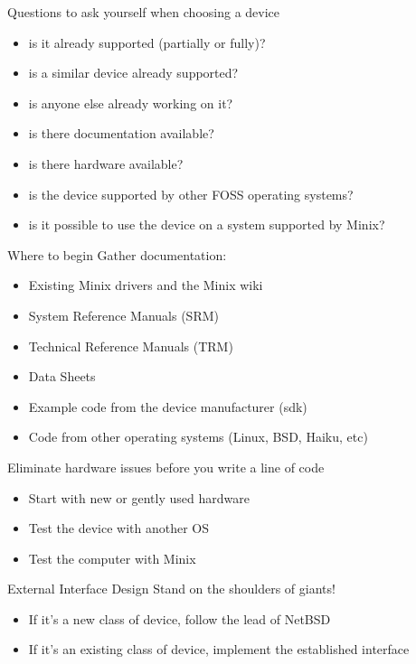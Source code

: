 \documentclass{beamer}
\begin{document}
\begin{frame}{Questions to ask yourself when choosing a device}
  \begin{itemize}
  \item is it already supported (partially or fully)?
  \item is a similar device already supported?
  \item is anyone else already working on it?
  \item is there documentation available?
  \item is there hardware available?
  \item is the device supported by other FOSS operating systems?
  \item is it possible to use the device on a system supported by Minix?
  \end{itemize}
\end{frame}

\begin{frame}{Where to begin}
  Gather documentation:
  \begin{itemize}
  \item Existing Minix drivers and the Minix wiki
  \item System Reference Manuals (SRM)
  \item Technical Reference Manuals (TRM)
  \item Data Sheets
  \item Example code from the device manufacturer (sdk)
  \item Code from other operating systems (Linux, BSD, Haiku, etc)
  \end{itemize}
\end{frame}

\begin{frame}{Eliminate hardware issues before you write a line of code}
  \begin{itemize}
  \item Start with new or gently used hardware
  \item Test the device with another OS
  \item Test the computer with Minix
  \end{itemize}
\end{frame}

\begin{frame}{External Interface Design}
  Stand on the shoulders of giants!
  \begin{itemize}
  \item If it's a new class of device, follow the lead of NetBSD
  \item If it's an existing class of device, implement the established interface
  \end{itemize}
\end{frame}
\end{document}
